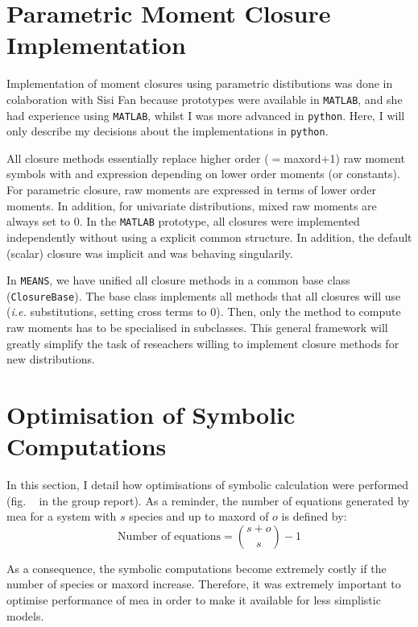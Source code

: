 \documentclass[11pt,a4paper]{article}
\newcommand{\means}{\texttt{MEANS}}
\newcommand{\py}{\texttt{python}}
\newcommand{\mat}{\texttt{MATLAB}}
\newcommand{\ie}{\emph{i.e.}}
\newcommand{\citationneeded}[2][]{\todo[color=brown, fancyline, #1]{\textbf{Citation Needed:} #2}}
\begin{document}
\section{Parametric Moment Closure Implementation}
Implementation of moment closures using parametric distibutions was done in colaboration 
with Sisi Fan because prototypes were available in \mat{}\cite{lakatos_preparation_2014}, and she had experience using \mat{}, 
whilst I was more advanced in \py{}. Here, I will only describe my decisions about the implementations in \py{}.

All closure methods essentially replace higher order ($=$\gls{maxord}+1) raw moment symbols with and expression depending on lower order moments (or constants).
For parametric closure, raw moments are expressed in terms of lower order moments.
In addition, for univariate distributions, mixed raw moments are always set to $0$.
In the \mat{} prototype, all closures were implemented independently without using a explicit common structure.
In addition, the default (scalar) closure was implicit and was behaving singularily.

In \means, we have unified all closure methods in a common base class (\texttt{ClosureBase}).
The base class implements all methods that all closures will use (\ie{} substitutions, setting cross terms to $0$).
Then, only the method to compute raw moments has to be specialised in subclasses.
This general framework will greatly simplify the task of reseachers willing
to implement closure methods for new distributions.

\section{Optimisation of Symbolic Computations}

\label{sec:optimisation}

In this section, I detail how optimisations of symbolic calculation were performed (fig. ~\citationneeded{find me} in the group report).
As a reminder, the number of equations generated by \gls{mea} for a system with $s$ species and up to \gls{maxord} of $o$
is defined by:
\begin{equation}
    \text{Number of equations} = {{s + o} \choose {s}} - 1
    \label{eq:number_of_equations}
\end{equation}

As a consequence, the symbolic computations become extremely costly if the number of species or \gls{maxord} increase.
Therefore, it was extremely important to optimise performance of \gls{mea} in order to make it available for less simplistic models.
\end{document}
